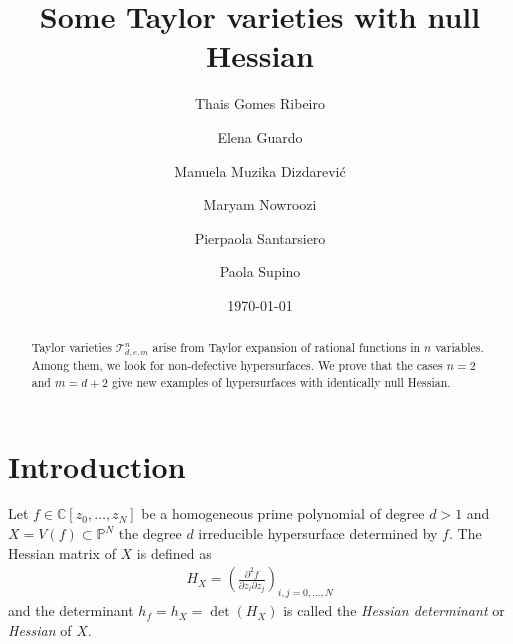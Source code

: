 \documentclass[letterpaper,11pt]{amsart}
\title{Some Taylor varieties with null Hessian} %
\date{\today}
\author[WINE-5 Taylor Varieties group]{Thais Gomes Ribeiro \and Elena Guardo \and Manuela Muzika Dizdarevi\'c \and Maryam Nowroozi \and Pierpaola Santarsiero \and Paola Supino }
\date{}
\theoremstyle{plain}
\theoremstyle{definition}
\newcommand{\tv}{\mathcal{T}}
\begin{document}
\begin{abstract}
 Taylor varieties $\tv^n_{d,e,m}$  arise from  Taylor expansion of rational functions in $n$ variables. Among them, we look for non-defective hypersurfaces.  We prove that the cases  $n=2$ and $m=d+2$   give   new examples of hypersurfaces with identically null Hessian.  
\end{abstract}
\maketitle
 
\section{Introduction}
Let $f \in \mathbb{C}[z_0,\dots,z_N]$ be a homogeneous prime polynomial of degree $d>1$ and $X=V(f) \subset \mathbb{P}^N$ the degree $d$ irreducible hypersurface determined by $f.$ The Hessian matrix of $X$ is defined as \begin{align*}
H_X=\left(\frac{\partial^2 f}{\partial z_i \partial z_j}\right)_{i,j=0,\dots,N} 
\end{align*} and the determinant $h_f=h_X=\det(H_X)$ is called the \emph{Hessian determinant} or \emph{Hessian} of $X.$
\end{document}
